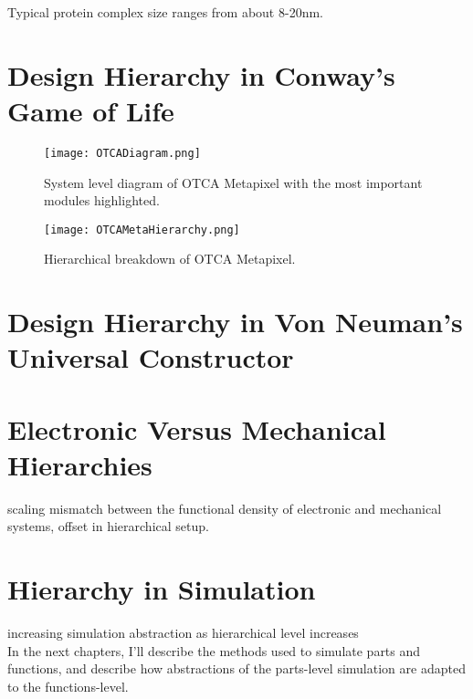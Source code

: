{Typical protein complex size ranges from about 8-20nm.  


\section{Design Hierarchy in Conway's Game of Life}

\begin{figure}
  \texttt{[image: OTCADiagram.png]}
  \caption{System level diagram of OTCA Metapixel with the most important modules highlighted.}
  \label{fig:OTCADiagram}
\end{figure}

\begin{sidewaysfigure}
  \texttt{[image: OTCAMetaHierarchy.png]}
  \caption{Hierarchical breakdown of OTCA Metapixel.}
  \label{fig:OTCAMetaHierarchy}
\end{sidewaysfigure}

\section{Design Hierarchy in Von Neuman's Universal Constructor}

\section{Electronic Versus Mechanical Hierarchies}

scaling mismatch between the functional density of electronic and mechanical systems, offset in hierarchical setup.

\section{Hierarchy in Simulation}

increasing simulation abstraction as hierarchical level increases\\

In the next chapters, I'll describe the methods used to simulate parts and functions, and describe how abstractions of the parts-level simulation are adapted to the functions-level.



}
